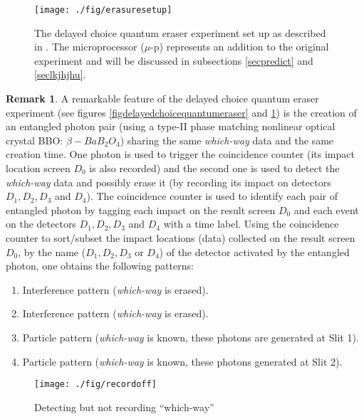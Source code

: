 \documentclass[11pt]{article}
\theoremstyle{definition}
\newtheorem{rmk}[thm]{Remark}
\begin{document}
 \begin{figure}[h!]
	\begin{center}
			\texttt{[image: ./fig/erasuresetup]}
		\caption{The delayed choice quantum eraser experiment set up as described in \cite{kim2000delayed}. The  microprocessor ($\mu$-p) represents an addition to the original experiment and will be discussed in subsections \ref{secpredict} and  \ref{seclkjhjhu}.
}\label{figerasuresetup}
	\end{center}
\end{figure}
\begin{rmk} \label{rmkfeature}
A  remarkable feature of the delayed choice quantum eraser experiment \cite{kim2000delayed} (see figures \ref{figdelayedchoicequantumeraser} and \ref{figerasuresetup}) is the creation of an entangled photon pair  (using a type-II phase matching nonlinear optical crystal BBO: $\beta - BaB_2O_4$) sharing the same \emph{which-way} data and the same creation time. One photon is used to trigger the coincidence counter (its impact location screen $D_0$ is also recorded) and the second one is used to detect the \emph{which-way} data and possibly erase it (by recording its impact on  detectors $D_1,D_2, D_3$ and $D_4$). The coincidence counter is used to identify each pair of entangled photon by tagging each impact on the result screen $D_0$ and each
event on the detectors $D_1,D_2, D_3$ and $D_4$ with a time label.
Using the coincidence counter to sort/subset the impact locations (data) collected on the result screen $D_0$, by
 the name ($D_1,D_2, D_3$ or $D_4$) of the detector activated by the entangled photon, one obtains the following patterns:

\begin{enumerate}[D1:]
\item  Interference pattern (\emph{which-way}  is erased).
\item Interference pattern (\emph{which-way}   is erased).
\item  Particle pattern (\emph{which-way}   is known, these photons are generated at Slit 1).
\item  Particle pattern (\emph{which-way}   is known, these photons generated at Slit 2).
\end{enumerate}
\end{rmk}


 \begin{figure}[h!]
	\begin{center}
			\texttt{[image: ./fig/recordoff]}
		\caption{Detecting but not recording ``which-way''}\label{figrecordoff}
	\end{center}
\end{figure}
\end{document}

